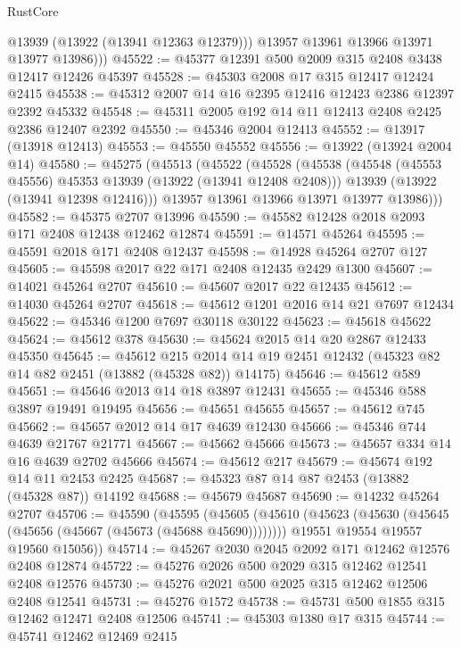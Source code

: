 \begin{lexlean}{RustCore}
\begin{coremodule}
            @13939
            (@13922 (@13941 @12363 @12379)))
          @13957
          @13961
          @13966
          @13971
          @13977
          @13986)))
@45522 := @45377 @12391 @500 @2009 @315 @2408 @3438 @12417 @12426 @45397
@45528 := @45303 @2008 @17 @315 @12417 @12424 @2415
@45538 := @45312 @2007 @14 @16 @2395 @12416 @12423 @2386 @12397 @2392 @45332
@45548 := @45311 @2005 @192 @14 @11 @12413 @2408 @2425 @2386 @12407 @2392
@45550 := @45346 @2004 @12413
@45552 := @13917 (@13918 @12413)
@45553 := @45550 @45552
@45556 := @13922 (@13924 @2004 @14)
@45580 := @45275
    (@45513
      (@45522
        (@45528
          (@45538
            (@45548 (@45553 @45556) @45353 @13939 (@13922 (@13941 @12408 @2408)))
            @13939
            (@13922 (@13941 @12398 @12416)))
          @13957
          @13961
          @13966
          @13971
          @13977
          @13986)))
@45582 := @45375 @2707 @13996
@45590 := @45582 @12428 @2018 @2093 @171 @2408 @12438 @12462 @12874
@45591 := @14571 @45264
@45595 := @45591 @2018 @171 @2408 @12437
@45598 := @14928 @45264 @2707 @127
@45605 := @45598 @2017 @22 @171 @2408 @12435 @2429 @1300
@45607 := @14021 @45264 @2707
@45610 := @45607 @2017 @22 @12435
@45612 := @14030 @45264 @2707
@45618 := @45612 @1201 @2016 @14 @21 @7697 @12434
@45622 := @45346 @1200 @7697 @30118 @30122
@45623 := @45618 @45622
@45624 := @45612 @378
@45630 := @45624 @2015 @14 @20 @2867 @12433 @45350
@45645 := @45612
    @215
    @2014
    @14
    @19
    @2451
    @12432
    (@45323 @82 @14 @82 @2451 (@13882 (@45328 @82)) @14175)
@45646 := @45612 @589
@45651 := @45646 @2013 @14 @18 @3897 @12431
@45655 := @45346 @588 @3897 @19491 @19495
@45656 := @45651 @45655
@45657 := @45612 @745
@45662 := @45657 @2012 @14 @17 @4639 @12430
@45666 := @45346 @744 @4639 @21767 @21771
@45667 := @45662 @45666
@45673 := @45657 @334 @14 @16 @4639 @2702 @45666
@45674 := @45612 @217
@45679 := @45674 @192 @14 @11 @2453 @2425
@45687 := @45323 @87 @14 @87 @2453 (@13882 (@45328 @87)) @14192
@45688 := @45679 @45687
@45690 := @14232 @45264 @2707
@45706 := @45590
    (@45595
      (@45605
        (@45610 (@45623 (@45630 (@45645 (@45656 (@45667 (@45673 (@45688 @45690))))))))
        @19551
        @19554
        @19557
        @19560
        @15056))
@45714 := @45267 @2030 @2045 @2092 @171 @12462 @12576 @2408 @12874
@45722 := @45276 @2026 @500 @2029 @315 @12462 @12541 @2408 @12576
@45730 := @45276 @2021 @500 @2025 @315 @12462 @12506 @2408 @12541
@45731 := @45276 @1572
@45738 := @45731 @500 @1855 @315 @12462 @12471 @2408 @12506
@45741 := @45303 @1380 @17 @315
@45744 := @45741 @12462 @12469 @2415

\end{coremodule}
\end{lexlean}
